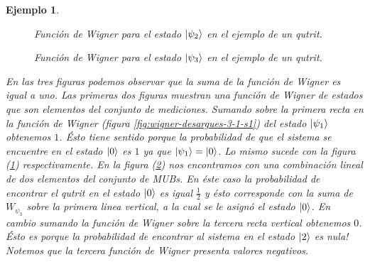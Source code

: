 \documentclass[a4paper]{report}
\newtheorem{example}{Ejemplo}
\begin{document}
\begin{example}
    \begin{figure}[ht]
      \centering
      \scalebox{0.7}{
        
      }
      \caption{Función de Wigner para el estado
        $\ket{\psi_2}$ en el ejemplo de un qutrit.}
      \label{fig:wigner-desargues-3-1-s2}
    \end{figure}
    
    \begin{figure}[ht]
      \centering
      \scalebox{0.7}{
        
      }
      \caption{Función de Wigner para el estado
        $\ket{\psi_3}$ en el ejemplo de un qutrit.}
      \label{fig:wigner-desargues-3-1-s3}
    \end{figure}

    En las tres figuras podemos observar que la suma de la
    función de Wigner es igual a uno. Las primeras dos
    figuras muestran una función de Wigner de estados que
    son elementos del conjunto de mediciones. Sumando sobre
    la primera recta en la función de Wigner (figura
    \ref{fig:wigner-desargues-3-1-s1}) del estado
    $\ket{\psi_1}$ obtenemos $1$. Ésto tiene sentido porque
    la probabilidad de que el sistema se encuentre en el
    estado $\ket 0$ es $1$ ya que $\ket{\psi_1} = \ket 0$.
    Lo mismo sucede con la figura
    (\ref{fig:wigner-desargues-3-1-s2}) respectivamente. En
    la figura (\ref{fig:wigner-desargues-3-1-s3}) nos
    encontramos con una combinación lineal de dos elementos
    del conjunto de MUBs. En éste caso la probabilidad de
    encontrar el qutrit en el estado $\ket 0$ es igual
    $\frac{1}{2}$ y ésto corresponde con la suma de
    $W_{\psi_3}$ sobre la primera linea vertical, a la cual
    se le asignó el estado $\ket 0$. En cambio sumando la
    función de Wigner sobre la tercera recta vertical
    obtenemos $0$. Ésto es porque la probabilidad de
    encontrar al sistema en el estado $\ket 2$ es nula!
    Notemos que la tercera función de Wigner presenta
    valores negativos.
  \end{example}
\end{document}
